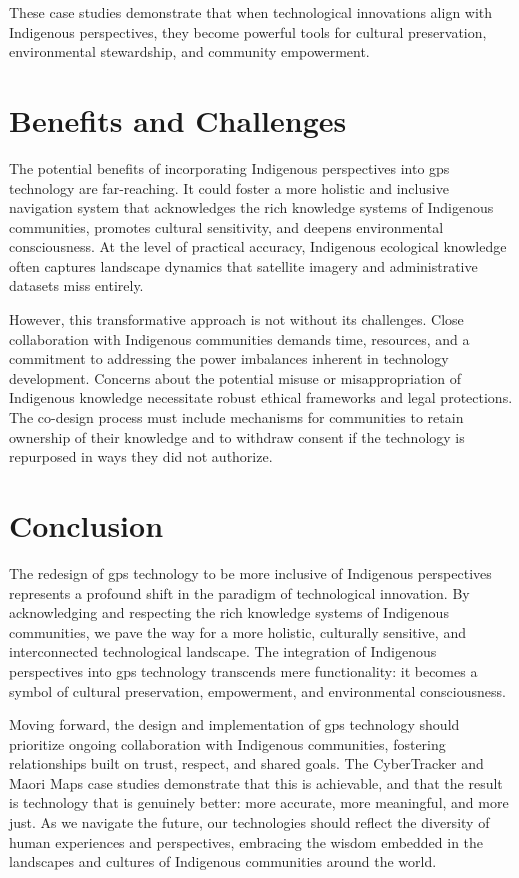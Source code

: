 \documentclass[11pt,showkeys]{essay}
\begin{document}
These case studies demonstrate that when technological innovations align with Indigenous perspectives, they become powerful tools for cultural preservation, environmental stewardship, and community empowerment.

\section{Benefits and Challenges}

The potential benefits of incorporating Indigenous perspectives into \gls{gps} technology are far-reaching. It could foster a more holistic and inclusive navigation system that acknowledges the rich knowledge systems of Indigenous communities, promotes cultural sensitivity, and deepens environmental consciousness. At the level of practical accuracy, Indigenous ecological knowledge often captures landscape dynamics that satellite imagery and administrative datasets miss entirely.

However, this transformative approach is not without its challenges. Close collaboration with Indigenous communities demands time, resources, and a commitment to addressing the power imbalances inherent in technology development. Concerns about the potential misuse or misappropriation of Indigenous knowledge necessitate robust ethical frameworks and legal protections. The co-design process must include mechanisms for communities to retain ownership of their knowledge and to withdraw consent if the technology is repurposed in ways they did not authorize.

\section{Conclusion}

The redesign of \gls{gps} technology to be more inclusive of Indigenous perspectives represents a profound shift in the paradigm of technological innovation. By acknowledging and respecting the rich knowledge systems of Indigenous communities, we pave the way for a more holistic, culturally sensitive, and interconnected technological landscape. The integration of Indigenous perspectives into \gls{gps} technology transcends mere functionality: it becomes a symbol of cultural preservation, empowerment, and environmental consciousness.

Moving forward, the design and implementation of \gls{gps} technology should prioritize ongoing collaboration with Indigenous communities, fostering relationships built on trust, respect, and shared goals. The CyberTracker and Maori Maps case studies demonstrate that this is achievable, and that the result is technology that is genuinely better: more accurate, more meaningful, and more just. As we navigate the future, our technologies should reflect the diversity of human experiences and perspectives, embracing the wisdom embedded in the landscapes and cultures of Indigenous communities around the world.


\end{document}
